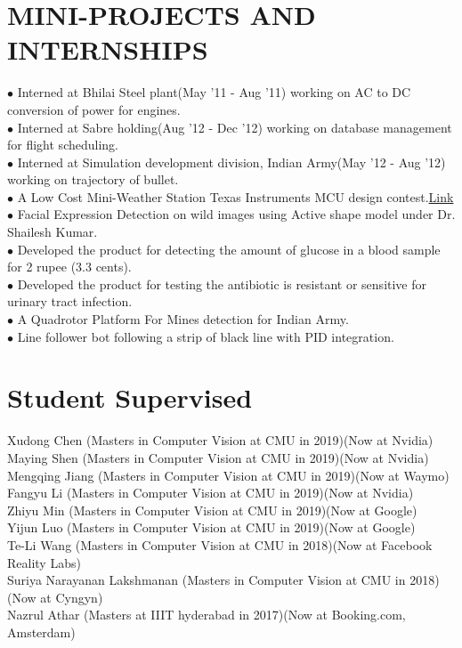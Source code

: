 \documentclass[7pt]{article}
\begin{document}
\begin{small}
\section{MINI-PROJECTS AND INTERNSHIPS} 
$\bullet$ Interned at Bhilai Steel plant(May '11 - Aug '11) working on AC to DC conversion of power for engines.\\
$\bullet$ Interned at Sabre holding(Aug '12 - Dec '12) working on database management for flight scheduling.\\
$\bullet$ Interned at Simulation development division, Indian Army(May '12 - Aug '12) working on trajectory of bullet.\\
$\bullet$ A Low Cost Mini-Weather Station Texas Instruments MCU design contest.\href{http://www.youtube.com/watch?v=kyFDzlU89iE}{Link} \\
$\bullet$ Facial Expression Detection on wild images using Active shape model under Dr. Shailesh Kumar. \\
$\bullet$ Developed the product for detecting the amount of glucose in a blood sample for 2 rupee (3.3 cents). \\
$\bullet$  Developed the product for testing the antibiotic is resistant or sensitive for urinary tract infection.\\
$\bullet$ A Quadrotor Platform For Mines detection for Indian Army.\\
$\bullet$ Line follower bot following a strip of black line with PID integration.\\
\vspace{-4 mm}

\section{Student Supervised} 
Xudong Chen (Masters in Computer Vision at CMU in 2019)(Now at Nvidia)\\
Maying Shen  (Masters in Computer Vision at CMU in 2019)(Now at Nvidia)\\
Mengqing Jiang (Masters in Computer Vision at CMU in 2019)(Now at Waymo)\\
Fangyu Li (Masters in Computer Vision at CMU in 2019)(Now at Nvidia)\\
Zhiyu Min (Masters in Computer Vision at CMU in 2019)(Now at Google)\\
Yijun Luo (Masters in Computer Vision at CMU in 2019)(Now at Google)\\
Te-Li Wang (Masters in Computer Vision at CMU in 2018)(Now at Facebook Reality Labs)\\
Suriya Narayanan Lakshmanan (Masters in Computer Vision at CMU in 2018)(Now at Cyngyn)\\
Nazrul Athar (Masters at IIIT hyderabad in 2017)(Now at Booking.com, Amsterdam)\\


\end{small}
\end{document}
